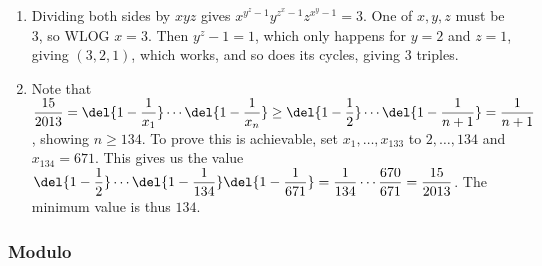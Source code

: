 \documentclass[10pt,paper=letter]{scrartcl}
\begin{document}
\begin{enumerate}
\item Dividing both sides by $xyz$ gives $x^{y^z - 1}y^{z^x - 1}z^{x^y - 1} = 3$. One of $x, y, z$ must be $3$, so WLOG $x = 3$. Then $y^z - 1 = 1$, which only happens for $y = 2$ and $z = 1$, giving $(3, 2, 1)$, which works, and so does its cycles, giving $3$ triples.

\item Note that $\dfrac{15}{2013} = \del{1 - \dfrac1{x_1}}\cdots\del{1 - \dfrac1{x_n}} \geq \del{1 - \dfrac12}\cdots\del{1 - \dfrac1{n+1}} = \dfrac1{n+1}$, showing $n \geq 134$. To prove this is achievable, set $x_1, \ldots, x_{133}$ to $2, \ldots, 134$ and $x_{134} = 671$. This gives us the value $\del{1 - \dfrac12}\cdots\del{1 - \dfrac1{134}}\del{1 - \dfrac1{671}} = \dfrac1{134} \cdots \dfrac{670}{671} = \dfrac{15}{2013}$. The minimum value is thus $134$.

\end{enumerate}

\subsubsection*{Modulo}
\end{document}
